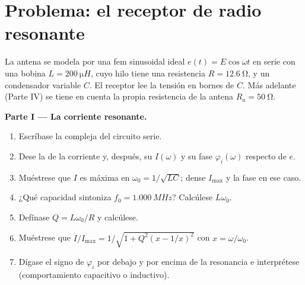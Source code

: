 \section{Problema: el receptor de radio resonante}

\begin{problem}
\label{pb:b1:sinusoidal-impedance:1}
La antena se modela por una fem sinusoidal ideal $e(t) = E\cos\omega t$ en
serie con una bobina $L = \qty{200}{\micro H}$, cuyo hilo tiene una
resistencia $R = \qty{12.6}{\ohm}$, y un condensador variable $C$. El
receptor lee la tensión en bornes de $C$. Más adelante (Parte IV) se tiene
en cuenta la propia resistencia de la antena $R_a = \qty{50}{\ohm}$.

\medskip
\noindent\textbf{Parte I --- La corriente resonante.}
\begin{enumerate}
  \item Escríbase la  compleja del circuito serie.
  \item Dese la  de la corriente y, después, su 
        $I(\omega)$ y su fase $\varphi_i(\omega)$ respecto de $e$.
  \item Muéstrese que $I$ es máxima en $\omega_0 = 1/\sqrt{LC}$; dense
        $I_{\max}$ y la fase en ese caso.
  \item ¿Qué capacidad sintoniza $f_0 = \qty{1.000}{MHz}$? Calcúlese
        $L\omega_0$.
  \item Defínase $Q = L\omega_0/R$ y calcúlese.
  \item Muéstrese que $I/I_{\max} = 1/\sqrt{1 + Q^2(x - 1/x)^2}$ con
        $x = \omega/\omega_0$.
  \item Dígase el signo de $\varphi_i$ por debajo y por encima de la
        resonancia e interprétese (comportamiento capacitivo o inductivo).
\end{enumerate}


\end{problem}

